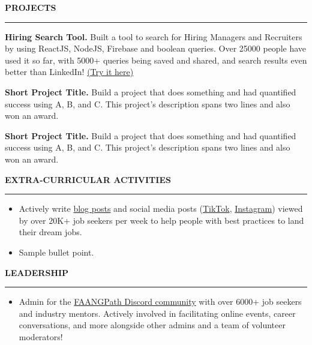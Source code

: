 \documentclass[11pt,letterpaper]{article}
\begin{document}
\medskip
\MakeUppercase{{\bf Projects}} %
\medskip
\hrule %
\begin{list}{}{\setlength{\leftmargin}{0em}}
\item %
\vspace{-1.25em}
\item \textbf{Hiring Search Tool.} {Built a tool to search for Hiring Managers and Recruiters by using ReactJS, NodeJS, Firebase and boolean queries. Over 25000 people have used it so far, with 5000+ queries being saved and shared, and search results even better than LinkedIn! \href{https://hiring-search.careerflow.ai/}{(Try it here)}}
\item \textbf{Short Project Title.} {Build a project that does something and had quantified success using A, B, and C. This project's description spans two lines and also won an award.}
\item \textbf{Short Project Title.} {Build a project that does something and had quantified success using A, B, and C. This project's description spans two lines and also won an award.}
\end{list}


\medskip
\MakeUppercase{{\bf Extra-Curricular Activities}} %
\medskip
\hrule %
\begin{list}{}{\setlength{\leftmargin}{0em}}
\item
\begin{itemize}
    \item 	Actively write \href{https://www.faangpath.com/blog/}{blog posts} and social media posts (\href{https://www.tiktok.com/@faangpath}{TikTok}, \href{https://www.instagram.com/faangpath/?hl=en}{Instagram}) viewed by over 20K+ job seekers per week to help people with best practices to land their dream jobs. 
    \item	Sample bullet point.
\end{itemize}
\end{list}



\medskip
\MakeUppercase{{\bf Leadership}} %
\medskip
\hrule %
\begin{list}{}{\setlength{\leftmargin}{0em}}
\item
\begin{itemize}
    \item Admin for the \href{https://discord.com/invite/WWbjEaZ}{FAANGPath Discord community} with over 6000+ job seekers and industry mentors. Actively involved in facilitating online events, career conversations, and more alongside other admins and a team of volunteer moderators! 
\end{itemize}
\end{list}
\end{document}
